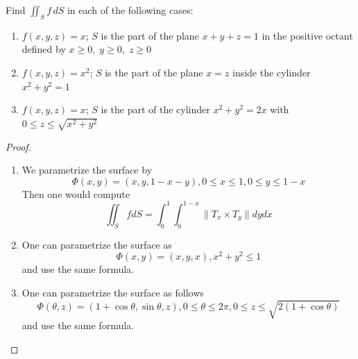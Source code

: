 \documentclass[openany]{book}
\begin{document}
\begin{prob}[12]
Find \(\displaystyle \iint_S f \, dS\) in each of the following cases:

\begin{enumerate}
    \item[(a)] \( f(x, y, z) = x \); \( S \) is the part of the plane  
          \( x + y + z = 1 \) in the positive octant defined by  
          \( x \geq 0, \; y \geq 0, \; z \geq 0 \)
    \item[(b)] \( f(x, y, z) = x^2 \); \( S \) is the part of the plane \( x = z \) inside the cylinder \( x^2 + y^2 = 1 \)
    \item[(c)] \( f(x, y, z) = x \); \( S \) is the part of the cylinder \( x^2 + y^2 = 2x \) with \( 0 \leq z \leq \sqrt{x^2 + y^2} \)
\end{enumerate}
\end{prob}
\begin{proof}
    \begin{enumerate}
        \item[(a)] We parametrize the surface by  
        \begin{equation*}
            \Phi(x,y)=(x,y, 1-x-y), 0\leq x\leq 1, 0\leq y\leq 1-x
        \end{equation*}
        Then one would compute 
        \begin{equation*}
            \iint_SfdS=\int_0^1\int_0^{1-x}\|T_x\times T_y\|dydx
        \end{equation*}
        \item[(b)] One can parametrize the surface as 
        \begin{equation*}
            \Phi(x,y)=(x,y,x), x^2+y^2\leq 1
        \end{equation*}
        and use the same formula.
        \item[(c)] One can parametrize the surface as follows 
        \begin{equation*}
            \Phi(\theta,z)=(1+\cos\theta, \sin\theta, z), 0\leq\theta\leq 2\pi, 0\leq z\leq \sqrt{2(1+\cos\theta)}
        \end{equation*}
        and use the same formula.
    \end{enumerate}
\end{proof}
\end{document}
